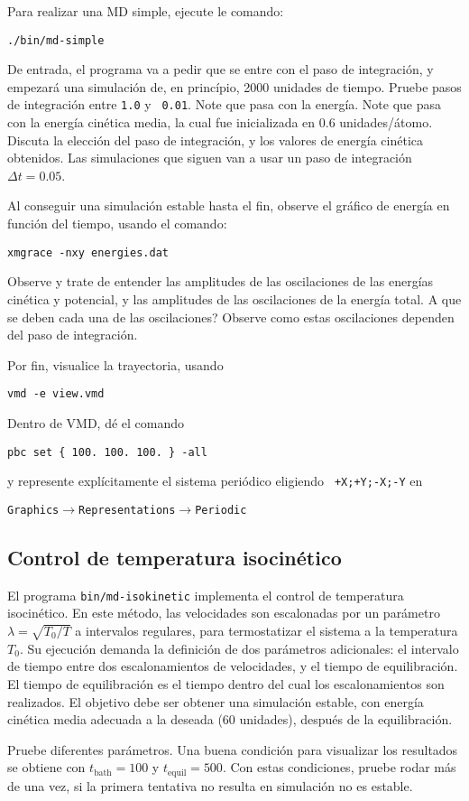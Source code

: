 \documentclass[10pt,a4paper,ssfamily]{exam}
\newcommand{\1}{{\bf 1}}
\newcommand{\2}{{\bf 2}}
\newcommand{\3}{{\bf 3}}
\newcommand{\command}[1]{\begin{center}{\tt #1}\end{center}}
\begin{document}
Para realizar una MD simple, ejecute le comando:
\command{./bin/md-simple} 
De entrada, el programa va a pedir que se
entre con el paso de integración, y empezará una simulación de, en princípio,
2000 unidades de tiempo.  Pruebe pasos de integración entre {\tt 1.0} y {\tt
0.01}. Note que pasa con la energía. Note que pasa con la energía
cinética media, la cual fue inicializada en 0.6 unidades/átomo. Discuta
la elección del paso de integración, y los valores de energía cinética
obtenidos. Las simulaciones que siguen van a usar un paso de integración
$\Delta t = 0.05$.

Al conseguir una simulación estable hasta
el fin, observe el gráfico de energía en función del tiempo, usando el
comando:
\command{xmgrace -nxy energies.dat}
Observe y trate de entender las amplitudes de las oscilaciones de las
energías cinética y potencial, y las amplitudes de las
oscilaciones de la energía total. A que se deben cada una de las
oscilaciones? Observe como estas oscilaciones dependen del paso de
integración.

Por fin, visualice la trayectoria, usando
\command{vmd -e view.vmd}
Dentro de VMD, dé el comando 
\command{pbc set \{ 100. 100. 100. \} -all}
y represente explícitamente el sistema periódico eligiendo {\tt
+X;+Y;-X;-Y} en
\command{Graphics$\to$Representations$\to$Periodic}


\subsection{Control de temperatura isocinético}

El programa {\tt bin/md-isokinetic} implementa el control de temperatura
isocinético. En este método, las velocidades son escalonadas por un
parámetro $\lambda = \sqrt{T_0/T}$ a intervalos regulares, para
termostatizar el sistema a la temperatura $T_0$. 
Su ejecución demanda la definición de dos parámetros
adicionales: el intervalo de tiempo entre dos escalonamientos de
velocidades, y el tiempo de equilibración. El tiempo de equilibración es
el tiempo dentro del cual los escalonamientos son realizados. El
objetivo debe ser obtener una simulación estable, con energía cinética
media adecuada a la deseada (60 unidades), después de la equilibración.

Pruebe diferentes parámetros. Una buena condición para visualizar los
resultados se obtiene con $t_{\mathrm{bath}}=100$ y
$t_{\mathrm{equil}}=500$. Con estas condiciones, pruebe rodar más de una
vez, si la primera tentativa no resulta en simulación no es estable.
\end{document}
